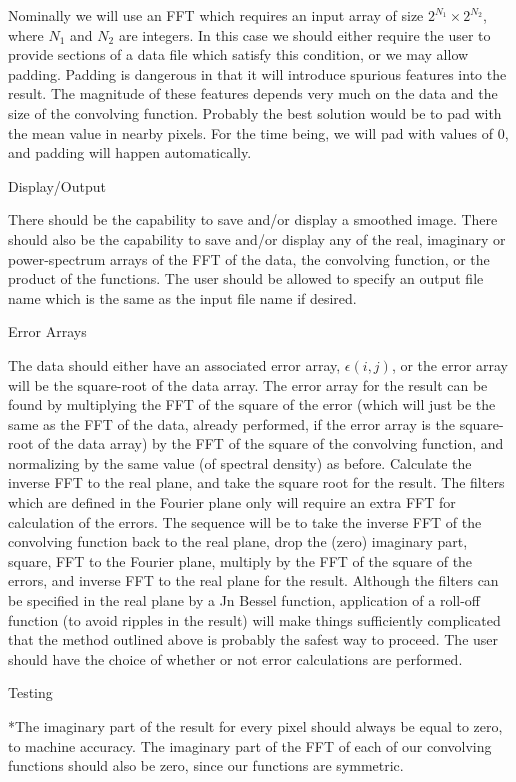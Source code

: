 Nominally we will use an FFT which requires an input array of size
$2^{N_1} \times 2^{N_2}$, where $N_1$ and $N_2$ are integers.
In this case we should either require the user to provide
sections of a data file which satisfy this condition, or we
may allow padding.  Padding is dangerous in that it will introduce
spurious features into the result.  The magnitude of these features
depends very much on the data and the size of the convolving function.
Probably the best solution would be to pad with the mean value in
nearby pixels.  For the time being, we will pad with values of 0, and
padding will happen automatically.

\@{Display/Output}

There should be the capability to save and/or display a
smoothed image.  There should also be the capability to
save and/or display any of the real, imaginary or power-spectrum
arrays of the FFT of the data, the convolving function, or the
product of the functions.   The user should be allowed to
specify an output file name which is the same as the input
file name if desired.

\@{Error Arrays}

The data should either have an associated error array,
$\epsilon(i,j)$, or the error array will be the square-root of the
data array.  The error array for the result can be found by
multiplying
the FFT of the square of the error (which will just be the same as the FFT of the
data, already performed, if the error array is the square-root of the
data array) by the FFT of the square of the
convolving function, and normalizing by the same value (of spectral
density) as before.  Calculate the inverse FFT to the real plane, and
take the square root for the result.  The filters which are defined in
the Fourier plane only will require an extra FFT for calculation of
the errors.  The sequence will be to take the inverse FFT of the
convolving function back to the real plane, drop the (zero) imaginary
part, square, FFT to the Fourier plane, multiply by the FFT of the
square of the errors, and inverse FFT to the real plane for the
result.
Although the filters can be specified in the real plane by a Jn Bessel
function, application of a roll-off function (to avoid ripples in the
result) will make things sufficiently complicated that the method
outlined above is probably the safest way to proceed.
The user
should have the choice of whether or not error calculations are performed.

\@{Testing}

\**The imaginary part of the result for every pixel should always be
equal to zero, to machine accuracy.  The imaginary part of the FFT of
each of our convolving functions should also be zero, since our
functions are symmetric.

